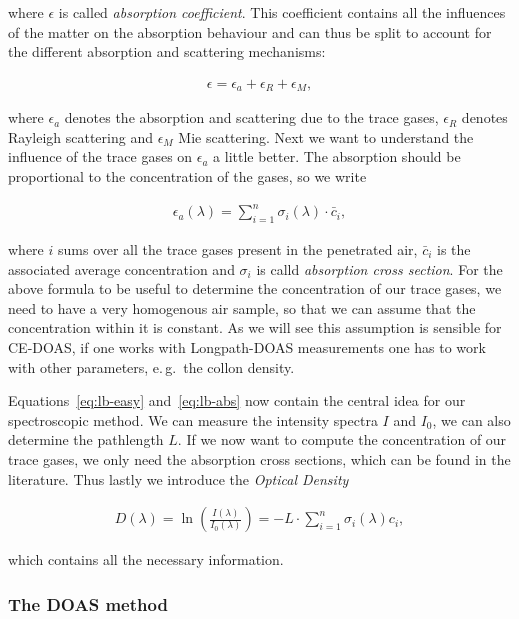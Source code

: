 where $\epsilon$ is called \emph{absorption coefficient}. This
coefficient contains all the influences of the matter on the
absorption behaviour and can thus be split to account for the different
absorption and scattering mechanisms:

\begin{align*}
  \epsilon = \epsilon_a + \epsilon_R + \epsilon_M,
\end{align*}

where $\epsilon_a$ denotes the absorption and scattering due to the
trace gases, $\epsilon_R$ denotes Rayleigh scattering and $\epsilon_M$
Mie scattering. Next we want to understand the influence of the trace
gases on $\epsilon_a$ a little better. The absorption should be
proportional to the concentration of the gases, so we write

\begin{align}
  \epsilon_a(\lambda) = \sum_{i=1}^n \sigma_i(\lambda) \cdot \bar c_i, \label{eq:lb-abs}
\end{align}

where $i$ sums over all the trace gases present in the penetrated
air, $\bar c_i$ is the associated average concentration and $\sigma_i$
is calld \emph{absorption cross section}. For the above formula to be
useful to determine the concentration of our trace gases, we need to
have a very homogenous air sample, so that we can assume that the
concentration within it is constant. As we will see this assumption is
sensible for CE-DOAS, if one works with Longpath-DOAS measurements one
has to work with other parameters, e.\,g.\ the collon density.

Equations~\eqref{eq:lb-easy} and~\eqref{eq:lb-abs} now contain the central idea for our
spectroscopic method. We can measure the intensity spectra $I$ and
$I_0$, we can also determine the pathlength $L$. If we now want to
compute the concentration of our trace gases, we only need the
absorption cross sections, which can be found in the
literature. Thus lastly we introduce the \emph{Optical
  Density} 

\begin{align*}
  D(\lambda) = \ln \left(\frac{I(\lambda)}{I_0(\lambda)}\right) = - L
  \cdot \sum_{i=1}^n \sigma_i(\lambda) c_i,
\end{align*}

which contains all the necessary information.

\subsubsection{The DOAS method}
\label{sec:doas}

